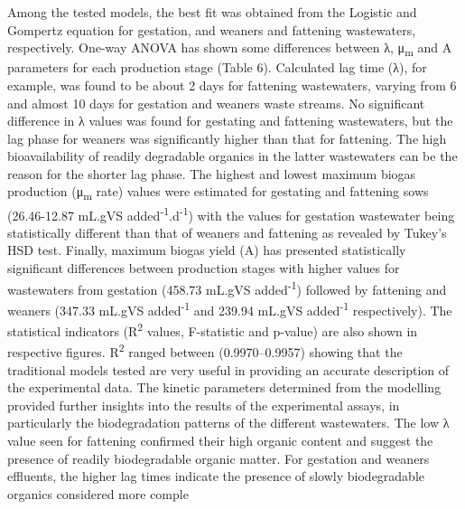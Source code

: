 Among the tested models, the best fit was obtained from the Logistic and Gompertz equation for gestation, and weaners and fattening wastewaters, respectively. One-way ANOVA has shown some differences between λ, μ\textsubscript{m} and A  parameters for each production stage (Table 6). Calculated lag time (λ), for example, was found to be about 2 days for fattening wastewaters, varying from 6 and almost 10 days for gestation and weaners waste streams. No significant difference in λ values was found for gestating and fattening wastewaters, but the lag phase for weaners was significantly higher than that for fattening. The high bioavailability of readily degradable organics in the latter wastewaters can be the reason for the shorter lag phase. The highest and lowest maximum biogas production (μ\textsubscript{m} rate) values were estimated for gestating and fattening sows (26.46-12.87 mL.gVS added\textsuperscript{-1}.d\textsuperscript{-1}) with the values for gestation wastewater being statistically different than that of weaners and fattening as revealed by Tukey’s HSD test. Finally, maximum biogas yield (A) has presented statistically significant differences between production stages with higher values for wastewaters from gestation (458.73 mL.gVS added\textsuperscript{-1}) followed by fattening and weaners (347.33 mL.gVS added\textsuperscript{-1} and 239.94 mL.gVS added\textsuperscript{-1} respectively). The statistical indicators (R\textsuperscript{2} values, F-statistic and p-value) are also shown in respective figures. R\textsuperscript{2} ranged between (0.9970–0.9957) showing that the traditional models tested are very useful in providing an accurate description of the experimental data. The kinetic parameters determined from the modelling provided further insights into the results of the experimental assays, in particularly the biodegradation patterns of the different wastewaters. The low λ value seen for fattening confirmed their high organic content and suggest the presence of readily biodegradable organic matter. For gestation and weaners effluents, the higher lag times indicate the presence of slowly biodegradable organics considered more comple